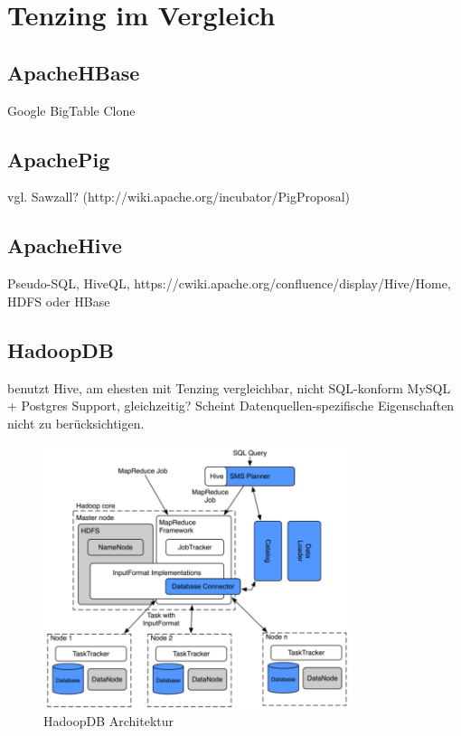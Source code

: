 \documentclass[a4paper]{article}
\begin{document}
\newpage

\section{Tenzing im Vergleich}

\subsection{Apache\texttrademark HBase}
Google BigTable Clone

\subsection{Apache\texttrademark Pig}
vgl. Sawzall? (http://wiki.apache.org/incubator/PigProposal)

\subsection{Apache\texttrademark Hive}
Pseudo-SQL, HiveQL, https://cwiki.apache.org/confluence/display/Hive/Home, HDFS oder HBase

\subsection{HadoopDB}
benutzt Hive, am ehesten mit Tenzing vergleichbar, nicht SQL-konform
MySQL + Postgres Support, gleichzeitig?
Scheint Datenquellen-spezifische Eigenschaften nicht zu berücksichtigen.

\begin{figure}[H]
\centering
\includegraphics[width=0.8\textwidth]{hadoopdb-architecture.png}
\caption{HadoopDB Architektur}
\label{fig:hadoopdb}
\end{figure}
\end{document}
